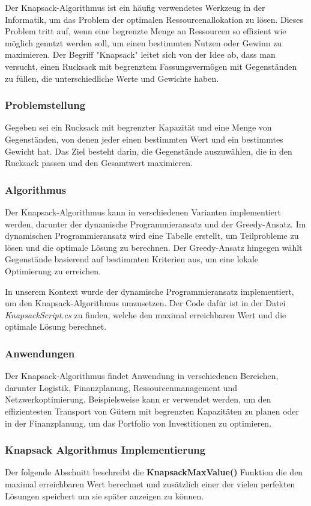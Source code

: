 Der Knapsack-Algorithmus ist ein häufig verwendetes Werkzeug in der Informatik, um das Problem der optimalen
Ressourcenallokation zu lösen. Dieses Problem tritt auf, wenn eine begrenzte Menge an Ressourcen so effizient wie
möglich genutzt werden soll, um einen bestimmten Nutzen oder Gewinn zu maximieren. Der Begriff "Knapsack" leitet sich
von der Idee ab, dass man versucht, einen Rucksack mit begrenztem Fassungsvermögen mit Gegenständen zu füllen, die
unterschiedliche Werte und Gewichte haben.

\subsubsection{Problemstellung}
Gegeben sei ein Rucksack mit begrenzter Kapazität und eine Menge von Gegenständen, von denen jeder einen bestimmten
Wert und ein bestimmtes Gewicht hat. Das Ziel besteht darin, die Gegenstände auszuwählen, die in den Rucksack passen
und den Gesamtwert maximieren.

\subsubsection{Algorithmus}
Der Knapsack-Algorithmus kann in verschiedenen Varianten implementiert werden, darunter der dynamische
Programmieransatz und der Greedy-Ansatz. Im dynamischen Programmieransatz wird eine Tabelle erstellt, um
Teilprobleme zu lösen und die optimale Lösung zu berechnen. Der Greedy-Ansatz hingegen wählt Gegenstände basierend
auf bestimmten Kriterien aus, um eine lokale Optimierung zu erreichen.

In unserem Kontext wurde der dynamische Programmieransatz implementiert, um den Knapsack-Algorithmus umzusetzen.
Der Code dafür ist in der Datei \textit{KnapsackScript.cs} zu finden, welche den maximal erreichbaren Wert und
die optimale Lösung berechnet.

\subsubsection{Anwendungen}
Der Knapsack-Algorithmus findet Anwendung in verschiedenen Bereichen, darunter Logistik, Finanzplanung,
Ressourcenmanagement und Netzwerkoptimierung. Beispielsweise kann er verwendet werden, um den effizientesten
Transport von Gütern mit begrenzten Kapazitäten zu planen oder in der Finanzplanung, um das Portfolio von
Investitionen zu optimieren.

\subsubsection{Knapsack Algorithmus Implementierung}
Der folgende Abschnitt beschreibt die \textbf{KnapsackMaxValue()} Funktion die den maximal erreichbaren Wert berechnet
und zusätzlich einer der vielen perfekten Lösungen speichert um sie später anzeigen zu können.\\

